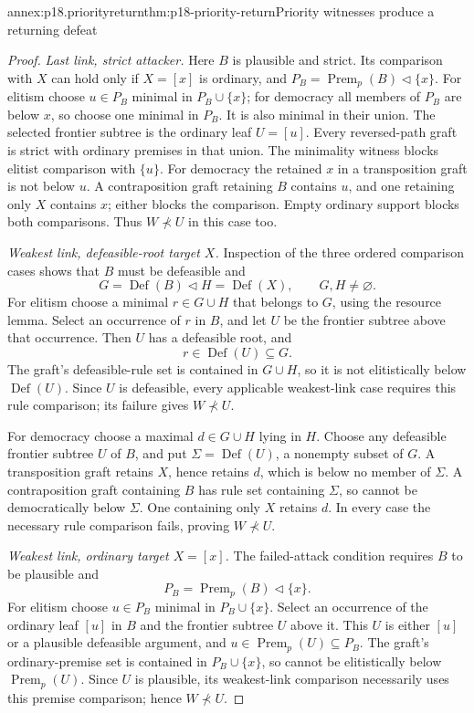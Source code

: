 \begin{annexitem}{annex:p18.priorityreturn}{thm:p18-priority-return}{Priority witnesses produce a returning defeat}
\begin{proof}
\emph{Last link, strict attacker.}
Here \(B\) is plausible and strict.
Its comparison with \(X\) can hold only if \(X=[x]\) is ordinary,
and \(P_B=\operatorname{Prem}_p(B)\triangleleft\{x\}\).
For elitism choose \(u\in P_B\) minimal in \(P_B\cup\{x\}\);
for democracy all members of \(P_B\) are below \(x\), so choose
one minimal in \(P_B\). It is also minimal in their union.
The selected frontier subtree is the ordinary leaf \(U=[u]\).
Every reversed-path graft is strict with ordinary premises in that union.
The minimality witness blocks elitist comparison with \(\{u\}\).
For democracy the retained \(x\) in a transposition graft is not below
\(u\). A contraposition graft retaining \(B\) contains \(u\), and
one retaining only \(X\) contains \(x\); either blocks the comparison.
Empty ordinary support blocks both comparisons.
Thus \(W\not\prec U\) in this case too.

\emph{Weakest link, defeasible-root target \(X\).}
Inspection of the three ordered comparison cases shows that \(B\)
must be defeasible and
\[
 G=\operatorname{Def}(B)\triangleleft
 H=\operatorname{Def}(X),\qquad G,H\ne\varnothing .
 \tag{5}
\]
For elitism choose a minimal \(r\in G\cup H\) that belongs to \(G\),
using the resource lemma. Select an occurrence of \(r\) in \(B\),
and let \(U\) be the frontier subtree above that occurrence.
Then \(U\) has a defeasible root, and
\[
 r\in\operatorname{Def}(U)\subseteq G.
 \]
The graft's defeasible-rule set is contained in \(G\cup H\),
so it is not elitistically below \(\operatorname{Def}(U)\).
Since \(U\) is defeasible, every applicable weakest-link case
requires this rule comparison; its failure gives \(W\not\prec U\).

For democracy choose a maximal \(d\in G\cup H\) lying in \(H\).
Choose any defeasible frontier subtree \(U\) of \(B\), and put
\(\Sigma=\operatorname{Def}(U)\), a nonempty subset of \(G\).
A transposition graft retains \(X\), hence retains \(d\), which
is below no member of \(\Sigma\).
A contraposition graft containing \(B\) has rule set containing
\(\Sigma\), so cannot be democratically below \(\Sigma\).
One containing only \(X\) retains \(d\). In every case the necessary
rule comparison fails, proving \(W\not\prec U\).

\emph{Weakest link, ordinary target \(X=[x]\).}
The failed-attack condition requires \(B\) to be plausible and
\[
 P_B=\operatorname{Prem}_p(B)\triangleleft\{x\}.
 \tag{6}
\]
For elitism choose \(u\in P_B\) minimal in \(P_B\cup\{x\}\).
Select an occurrence of the ordinary leaf \([u]\) in \(B\) and
the frontier subtree \(U\) above it. This \(U\) is either \([u]\)
or a plausible defeasible argument, and
\(u\in\operatorname{Prem}_p(U)\subseteq P_B\).
The graft's ordinary-premise set is contained in \(P_B\cup\{x\}\),
so cannot be elitistically below \(\operatorname{Prem}_p(U)\).
Since \(U\) is plausible, its weakest-link comparison necessarily
uses this premise comparison; hence \(W\not\prec U\).


\end{proof}
\end{annexitem}
